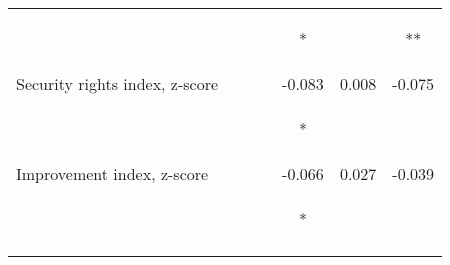\begin{tabular}{lcccccc}
 & \begin{footnotesize}[0.013]\end{footnotesize} & \begin{footnotesize}[0.021]\end{footnotesize} & \begin{footnotesize}[0.019]\end{footnotesize} & \begin{footnotesize}[0.007]*\end{footnotesize} & \begin{footnotesize}[0.009]\end{footnotesize} & \begin{footnotesize}[0.007]**\end{footnotesize}\\
\noalign{\smallskip}Security rights index, z-score &  &  &  & -0.083 & 0.008 & -0.075\\
 & \begin{footnotesize}\end{footnotesize} & \begin{footnotesize}\end{footnotesize} & \begin{footnotesize}\end{footnotesize} & \begin{footnotesize}[0.044]*\end{footnotesize} & \begin{footnotesize}[0.064]\end{footnotesize} & \begin{footnotesize}[0.054]\end{footnotesize}\\
\noalign{\smallskip}Improvement index, z-score &  &  &  & -0.066 & 0.027 & -0.039\\
 & \begin{footnotesize}\end{footnotesize} & \begin{footnotesize}\end{footnotesize} & \begin{footnotesize}\end{footnotesize} & \begin{footnotesize}[0.039]*\end{footnotesize} & \begin{footnotesize}[0.061]\end{footnotesize} & \begin{footnotesize}[0.056]\end{footnotesize}\\
\noalign{\smallskip}\hline\end{tabular}
